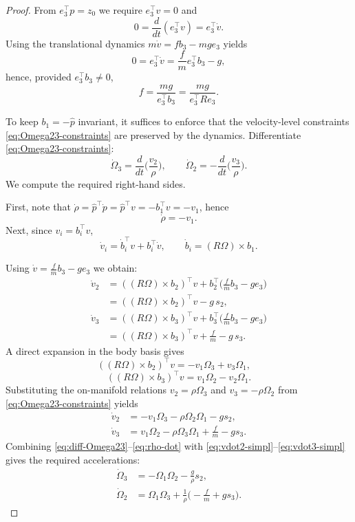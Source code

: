 \documentclass[10pt,a4paper]{amsart}
\begin{document}
\begin{proof}
From $e_3^\top p=z_0$ we require $e_3^\top v=0$ and
\[
0=\frac{d}{dt}(e_3^\top v)=e_3^\top \dot v.
\]
Using the translational dynamics $m\dot v=f b_3-mg e_3$ yields
\[
0=e_3^\top\dot v=\frac{f}{m}e_3^\top b_3-g,
\]
hence, provided $e_3^\top b_3\neq 0$,
\begin{equation}\label{eq:f-law}
{\quad f=\frac{mg}{e_3^\top b_3}=\frac{mg}{e_3^\top R e_3}.\quad}
\end{equation}

To keep $b_1=-\hat{p}$ invariant, it suffices to enforce that the velocity-level constraints \eqref{eq:Omega23-constraints} are preserved by the dynamics. Differentiate \eqref{eq:Omega23-constraints}:
\begin{equation}\label{eq:diff-Omega23}
\dot\Omega_3 = \frac{d}{dt}\Big(\frac{v_2}{\rho}\Big),\qquad
\dot\Omega_2 = -\frac{d}{dt}\Big(\frac{v_3}{\rho}\Big).
\end{equation}
We compute the required right-hand sides.

First, note that $\dot\rho = \hat{p}^\top \dot p = \hat{p}^\top v = -b_1^\top v = -v_1$, hence
\begin{equation}\label{eq:rho-dot}
\dot\rho = -v_1.
\end{equation}
Next, since $v_i=b_i^\top v$,
\[
\dot v_i = \dot b_i^\top v + b_i^\top \dot v,\qquad \dot b_i=(R \Omega)\times b_1.
\]

Using $\dot v=\frac{f}{m}b_3-ge_3$ we obtain:
\begin{align*}
\dot v_2 &= ((R \Omega)\times b_2)^\top v + b_2^\top \Big(\frac{f}{m}b_3-ge_3\Big)\\
&= ((R \Omega)\times b_2)^\top v - g\, s_2,\\
\dot v_3 &= ((R \Omega)\times b_3)^\top v + b_3^\top \Big(\frac{f}{m}b_3-ge_3\Big)\\
&= ((R \Omega)\times b_3)^\top v + \frac{f}{m}- g\, s_3.
\end{align*}
A direct expansion in the body basis gives
\[
((R \Omega)\times b_2)^\top v =- v_1\Omega_3 + v_3\Omega_1,\quad\]
\[
((R \Omega)\times b_3)^\top v = v_1\Omega_2 - v_2\Omega_1.
\]
Substituting the on-manifold relations $v_2=\rho\Omega_3$ and $v_3=-\rho\Omega_2$ from \eqref{eq:Omega23-constraints} yields
\begin{align}
\dot v_2 &= -v_1\Omega_3 - \rho\Omega_2\Omega_1 - g s_2,\label{eq:vdot2-simpl}\\
\dot v_3 &= v_1\Omega_2 - \rho\Omega_3\Omega_1 + \frac{f}{m}- g s_3.\label{eq:vdot3-simpl}
\end{align}
Combining \eqref{eq:diff-Omega23}--\eqref{eq:rho-dot} with \eqref{eq:vdot2-simpl}--\eqref{eq:vdot3-simpl} gives the required accelerations:
\begin{equation}\label{eq:Omega23dot-required}
{\begin{aligned}
\dot\Omega_3 &= -\Omega_1\Omega_2 - \frac{g}{\rho}s_2,\\[1mm]
\dot\Omega_2 &= \Omega_1\Omega_3 + \frac{1}{\rho}\Big(-\frac{f}{m}+g s_3\Big).
\end{aligned}}
\end{equation}


\end{proof}
\end{document}

